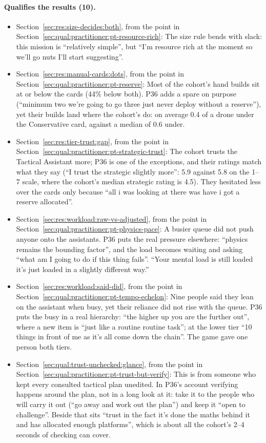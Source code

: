 \paragraph*{Qualifies the results (10).}
\begin{itemize}[leftmargin=1.2em,itemsep=1pt]\small
\item Section~\ref{sec:res:size-decides:both}, from the point in Section~\ref{sec:qual:practitioner:pt-resource-rich}: The size rule bends with slack: this mission is ``relatively simple'', but ``I'm resource rich at the moment so we'll go nuts I'll start suggesting''.
\item Section~\ref{sec:res:manual-cards:dots}, from the point in Section~\ref{sec:qual:practitioner:pt-reserve}: Most of the cohort's hand builds sit at or below the cards (44\% below both). P36 adds a spare on purpose (``minimum two we're going to go three just never deploy without a reserve''), yet their builds land where the cohort's do: on average 0.4 of a drone under the Conservative card, against a median of 0.6 under.
\item Section~\ref{sec:res:tier-trust:gap}, from the point in Section~\ref{sec:qual:practitioner:pt-strategic-trust}: The cohort trusts the Tactical Assistant more; P36 is one of the exceptions, and their ratings match what they say (``I trust the strategic slightly more'': 5.9 against 5.8 on the 1--7 scale, where the cohort's median strategic rating is 4.5). They hesitated less over the cards only because ``all i was looking at there was have i got a reserve allocated''.
\item Section~\ref{sec:res:workload:raw-vs-adjusted}, from the point in Section~\ref{sec:qual:practitioner:pt-physics-pace}: A busier queue did not push anyone onto the assistants. P36 puts the real pressure elsewhere: ``physics remains the bounding factor'', and the load becomes waiting and asking ``what am I going to do if this thing fails''. ``Your mental load is still loaded it's just loaded in a slightly different way.''
\item Section~\ref{sec:res:workload:said-did}, from the point in Section~\ref{sec:qual:practitioner:pt-tempo-echelon}: Nine people said they lean on the assistant when busy, yet their reliance did not rise with the queue. P36 puts the busy in a real hierarchy: ``the higher up you are the further out'', where a new item is ``just like a routine routine task''; at the lower tier ``10 things in front of me as it's all come down the chain''. The game gave one person both tiers.
\item Section~\ref{sec:qual:trust-unchecked:glance}, from the point in Section~\ref{sec:qual:practitioner:pt-trust-but-verify}: This is from someone who kept every consulted tactical plan unedited. In P36's account verifying happens around the plan, not in a long look at it: take it to the people who will carry it out (``go away and work out the plan'') and keep it ``open to challenge''. Beside that sits ``trust in the fact it's done the maths behind it and has allocated enough platforms'', which is about all the cohort's 2--4 seconds of checking can cover.

\end{itemize}
